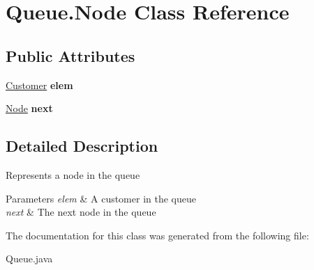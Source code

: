 \hypertarget{class_queue_1_1_node}{}\section{Queue.\+Node Class Reference}
\label{class_queue_1_1_node}
\subsection*{Public Attributes}
\begin{DoxyCompactItemize}
\item 
\hypertarget{class_queue_1_1_node_a2f6751fb2cfb71f9fa38582d2fcbeacc}{}\hyperlink{class_customer}{Customer} {\bfseries elem}\label{class_queue_1_1_node_a2f6751fb2cfb71f9fa38582d2fcbeacc}

\item 
\hypertarget{class_queue_1_1_node_a285b619a2d8165b0cd4feb283587164e}{}\hyperlink{class_queue_1_1_node}{Node} {\bfseries next}\label{class_queue_1_1_node_a285b619a2d8165b0cd4feb283587164e}

\end{DoxyCompactItemize}


\subsection{Detailed Description}
Represents a node in the queue 
\begin{DoxyParams}{Parameters}
{\em elem} & A customer in the queue \\
\hline
{\em next} & The next node in the queue \\
\hline
\end{DoxyParams}


The documentation for this class was generated from the following file\+:\begin{DoxyCompactItemize}
\item 
Queue.\+java\end{DoxyCompactItemize}
